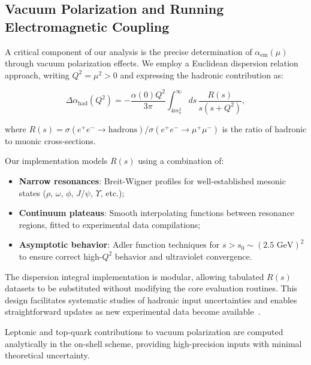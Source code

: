 \documentclass[%
amsmath,amssymb,
aps,
prb,
floatfix,
twocolumn
]{revtex4-2}
\begin{document}
\subsection{Vacuum Polarization and Running Electromagnetic Coupling}
\label{subsec:vacuum_polarization}

A critical component of our analysis is the precise determination of $\alpha_{\text{em}}(\mu)$ through vacuum polarization effects. We employ a Euclidean dispersion relation approach, writing $Q^2 = \mu^2 > 0$ and expressing the hadronic contribution as:

\begin{equation}
\Delta\alpha_{\text{had}}(Q^2) = -\frac{\alpha(0) Q^2}{3\pi} \int_{4m_\pi^2}^{\infty} ds \, \frac{R(s)}{s(s + Q^2)},
\label{eq:hadronic_vpol}
\end{equation}

where $R(s) = \sigma(e^+e^- \to \text{hadrons})/\sigma(e^+e^- \to \mu^+\mu^-)$ is the ratio of hadronic to muonic cross-sections.

Our implementation models $R(s)$ using a combination of:

\begin{itemize}
\item \textbf{Narrow resonances}: Breit-Wigner profiles for well-established mesonic states ($\rho$, $\omega$, $\phi$, $J/\psi$, $\Upsilon$, etc.);

\item \textbf{Continuum plateaus}: Smooth interpolating functions between resonance regions, fitted to experimental data compilations;

\item \textbf{Asymptotic behavior}: Adler function techniques for $s > s_0 \sim (2.5 \text{ GeV})^2$ to ensure correct high-$Q^2$ behavior and ultraviolet convergence.
\end{itemize}

The dispersion integral implementation is modular, allowing tabulated $R(s)$ datasets to be substituted without modifying the core evaluation routines. This design facilitates systematic studies of hadronic input uncertainties and enables straightforward updates as new experimental data become available~\cite{EidelmanJegerlehner1995,Jegerlehner2003,Keshavarzi2019,Davier2017}.

Leptonic and top-quark contributions to vacuum polarization are computed analytically in the on-shell scheme, providing high-precision inputs with minimal theoretical uncertainty.
\end{document}
